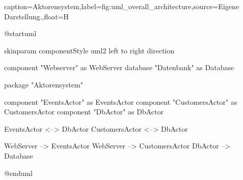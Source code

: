 \begin{dhbwfigure}{caption=Aktorensystem,label=fig:uml_overall_architecture,source={Eigene Darstellung.},float=H}
    \begin{plantuml}
        @startuml

            skinparam componentStyle uml2
            left to right direction

            component "Webserver" as WebServer
            database "Datenbank" as Database

            package "Aktorensystem" {
                component "EventsActor" as EventsActor
                component "CustomersActor" as CustomersActor
                component "DbActor" as DbActor

                EventsActor <--> DbActor
                CustomersActor <--> DbActor
            }

            WebServer --> EventsActor
            WebServer --> CustomersActor
            DbActor --> Database

        @enduml
    \end{plantuml}
\end{dhbwfigure}\unskip
